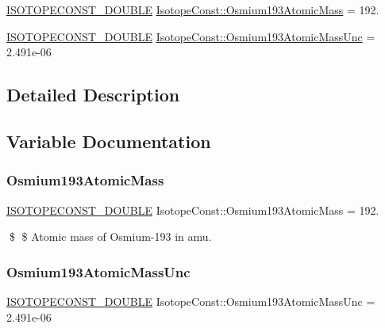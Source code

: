 \begin{DoxyCompactItemize}
\item 
\mbox{\hyperlink{group___isotope_const-_macros_ga8f45a7272ce02c0b4c65c44636ed719a}{I\+S\+O\+T\+O\+P\+E\+C\+O\+N\+S\+T\+\_\+\+D\+O\+U\+B\+LE}} \mbox{\hyperlink{group___isotope_const-_osmium-_os193_gabece6c4104e5c852f0d7cde1e3c8c17c}{Isotope\+Const\+::\+Osmium193\+Atomic\+Mass}} = 192.
\item 
\mbox{\hyperlink{group___isotope_const-_macros_ga8f45a7272ce02c0b4c65c44636ed719a}{I\+S\+O\+T\+O\+P\+E\+C\+O\+N\+S\+T\+\_\+\+D\+O\+U\+B\+LE}} \mbox{\hyperlink{group___isotope_const-_osmium-_os193_ga0d64f1965a92ca4cd7922ad45c1faeb2}{Isotope\+Const\+::\+Osmium193\+Atomic\+Mass\+Unc}} = 2.\+491e-\/06
\end{DoxyCompactItemize}


\subsection{Detailed Description}


\subsection{Variable Documentation}
\mbox{\label{group___isotope_const-_osmium-_os193_gabece6c4104e5c852f0d7cde1e3c8c17c}} 
\subsubsection{\texorpdfstring{Osmium193\+Atomic\+Mass}{Osmium193AtomicMass}}
{\footnotesize\ttfamily \mbox{\hyperlink{group___isotope_const-_macros_ga8f45a7272ce02c0b4c65c44636ed719a}{I\+S\+O\+T\+O\+P\+E\+C\+O\+N\+S\+T\+\_\+\+D\+O\+U\+B\+LE}} Isotope\+Const\+::\+Osmium193\+Atomic\+Mass = 192.}

\$ \$ Atomic mass of Osmium-\/193 in amu. \mbox{\label{group___isotope_const-_osmium-_os193_ga0d64f1965a92ca4cd7922ad45c1faeb2}} 
\subsubsection{\texorpdfstring{Osmium193\+Atomic\+Mass\+Unc}{Osmium193AtomicMassUnc}}
{\footnotesize\ttfamily \mbox{\hyperlink{group___isotope_const-_macros_ga8f45a7272ce02c0b4c65c44636ed719a}{I\+S\+O\+T\+O\+P\+E\+C\+O\+N\+S\+T\+\_\+\+D\+O\+U\+B\+LE}} Isotope\+Const\+::\+Osmium193\+Atomic\+Mass\+Unc = 2.\+491e-\/06}

